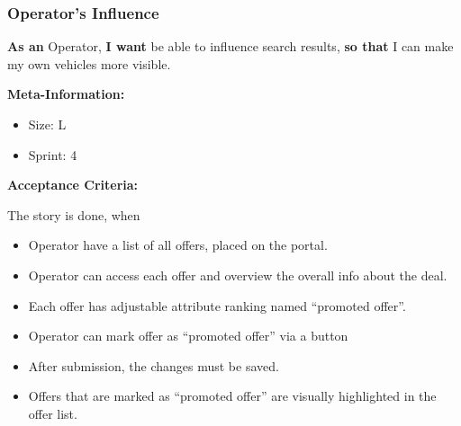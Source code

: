 \subsubsection{Operator's Influence}

\textbf{As an} Operator,\hfill\break
\textbf{I want} be able to influence search results,\hfill\break
\textbf{so that} I can make my own vehicles more visible.

\textbf{Meta-Information:}
\begin{itemize}
    \item Size: L
    \item Sprint: 4
\end{itemize}

\textbf{Acceptance Criteria:}

The story is done, when
\begin{itemize}
    \item Operator have a list of all offers, placed on the portal.
    \item Operator can access each offer and overview the overall info about the deal.
    \item Each offer has adjustable attribute ranking named “promoted offer”.
    \item Operator can mark offer as “promoted offer” via a button
    \item After submission, the changes must be saved.
    \item Offers that are marked as “promoted offer” are visually highlighted in the offer list.
\end{itemize}
